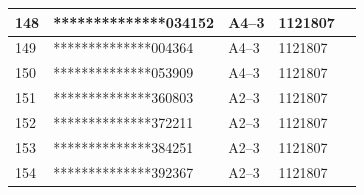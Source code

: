\documentclass[UTF8,10pt,a4paper,fontset=fandol]{ctexart}
\newcommand{\fieldvalue}[1]{#1}
\begin{document}
\begin{center}
\begin{tabular}{|p{1.0cm}|p{3.8cm}|p{2.3cm}|p{2.8cm}|p{2.2cm}|}
\fieldvalue{148} &
\fieldvalue{**************034152} &
\fieldvalue{A4--3} &
\fieldvalue{1121807} & \\ \hline
\fieldvalue{149} &
\fieldvalue{**************004364} &
\fieldvalue{A4--3} &
\fieldvalue{1121807} & \\ \hline
\fieldvalue{150} &
\fieldvalue{**************053909} &
\fieldvalue{A4--3} &
\fieldvalue{1121807} & \\ \hline
\fieldvalue{151} &
\fieldvalue{**************360803} &
\fieldvalue{A2--3} &
\fieldvalue{1121807} & \\ \hline
\fieldvalue{152} &
\fieldvalue{**************372211} &
\fieldvalue{A2--3} &
\fieldvalue{1121807} & \\ \hline
\fieldvalue{153} &
\fieldvalue{**************384251} &
\fieldvalue{A2--3} &
\fieldvalue{1121807} & \\ \hline
\fieldvalue{154} &
\fieldvalue{**************392367} &
\fieldvalue{A2--3} &
\fieldvalue{1121807} & \\ \hline

\end{tabular}
\end{center}
\end{document}
